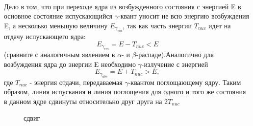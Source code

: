 \documentclass{article}
\begin{document}
\\
\indent Дело в том, что при переходе ядра из возбужденного состояния с энергией E в основное состояние испускающийся $\gamma$-квант уносит не всю энергию возбуждения E, а несколько меньшую величину $E_{\gamma_{em}}$, так как часть энергии $T_{nuc}$ идет на отдачу испускающего ядра: 
$$ E_{\gamma_{em}} = E - T_{nuc} < E$$
(сравните с аналогичным явлением в $\alpha$- и $\beta$-распаде).Аналогично для возбуждения ядра до энергии E необходимо $\gamma$-излучение с энергией 
$$ E_{\gamma_{abs}} = E + T_{nuc} > E,$$
где $T_{nuc}$ - энергия отдачи, передаваемая $\gamma$-квантом поглощающему ядру. Таким образом, линия испускания и линия поглощения для одного и того же состояния в данном ядре сдвинуты относительно друг друга на 2$T_{nuc}$

\begin{figure}[h]
\caption{сдвиг}
\label{fig:image}
\end{figure}
\end{document}
